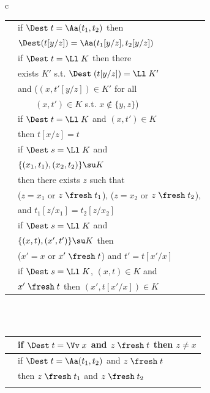\begin{figure}
{\begin{tabular}{c}
\begin{tabular}{|c|l|}
	\textrm{\IRnAp}  & 
	if $\Dest\;t = \Aa(t_1,t_2)$ then 
	\\&
	$\Dest(t[y / z]) = \Aa(t_1[y / z],t_2[y / z])$
	\\\hline 
	\textrm{\IRnLmO}  
	&
	if $\Dest\;t = \Ll\;K$  
	then there 
		\\&
		exists $K'$ 
	s.t. $\Dest\;(t[y/z]) = \Ll\;K'$ 
	\\&
	and ($(x,t'[y/z]) \in K'$ 
	for all 
		\\&
	 \ \ \ \hspace*{2ex} $\,(x,t') \in K$ 
	s.t. $x \not\in \{y,z\}$) 
	\\\hline 
	\textrm{\IRnLmT}  & 
	if $\Dest\;t = \Ll\;K$ and $(x,t') \in K$
	\\& then 
	$t[x / z] = t$
		\\\hline 
	\textrm{\IRnCg} 
	&
	if $\Dest\;s = \Ll\;K$ and 
	\\&
	$\{(x_1,t_1),(x_2,t_2)\} \su K$ 
	\\
	&
	then there exists $z$ such that 
	\\&
	($z = x_1$ or $z\;\fresh\;t_1$), 
	($z = x_2$ or $z\;\fresh\;t_2$), 
	\\& and 
	$t_1[z /  x_1] = t_2[z / x_2]$ 
	\\\hline 
	\textrm{\IRnBvr}  &	
	if $\Dest\;s = \Ll\;K$ and 
	\\&
	$\{(x,t),(x',t')\} \su K$ then 
	\\
	&
	($x' = x$ or $x'\;\fresh\;t$) and $t' = t[x' / x]$
	\\\hline 
   \textrm{\IIRnBvr}  &	
	if $\Dest\;s = \Ll\;K$,  $(x,t) \in K$ and 
	\\
	&
	$x'\;\fresh\;t$  then $(x',t[x' / x]) \in K$
	\\\hline 
\end{tabular} 
\\ \\ \vspace*{-1.5ex}
	\begin{tabular}{|c|l|}	
	\hline 
	\textrm{\IFrVr} & 
	if $\Dest\;t = \Vv\;x$ and $z\;\fresh\;t$ then $z\not=x$
	\\\hline
	\textrm{\IFrAp} &
	if $\Dest\;t = \Aa(t_1,t_2)$ and $z\;\fresh\;t$
	\\& then $z\;\fresh\;t_1$ and $z\;\fresh\;t_2$
	\\\hline
	\textrm{\IFrLm}  &

\end{tabular}
\end{tabular}}
\end{figure}
